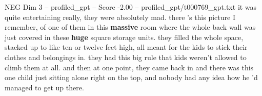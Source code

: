 \begin{textsample}{NEG Dim 3 – profiled\_gpt – Score -2.00 – profiled\_gpt/t000769\_gpt.txt}  \label{ex:f3_neg_024}
it was quite entertaining really, they were absolutely mad. there ’s this picture I remember, of one of them in this \textbf{massive} room where the whole back wall was just covered in these \textbf{huge} square storage units. they filled the whole space, stacked up to like ten or twelve feet high, all meant for the kids to stick their clothes and belongings in. they had this big rule that kids weren't allowed to climb them at all. and then at one point, they came back in and there was this one child just sitting alone right on the top, and nobody had any idea how he ’d managed to get up there.

\end{textsample}
